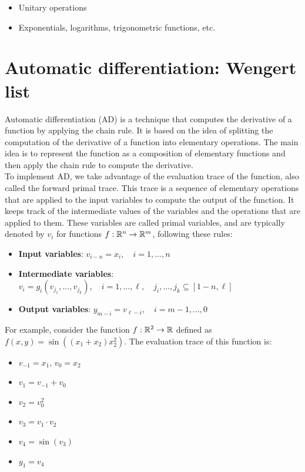 \begin{itemize}
    \item Unitary operations
    \item Exponentials, logarithms, trigonometric functions, etc.
\end{itemize}


\section{Automatic differentiation: Wengert list}

Automatic differentiation (AD) is a technique that computes the derivative of a function by applying the 
chain rule. It is based on the idea of splitting the computation of the derivative of a function into 
elementary operations. The main idea is to represent the function as a composition of elementary functions
and then apply the chain rule to compute the derivative.\\

To implement AD, we take advantage of the evaluation trace of the function, also called the forward primal
trace. This trace is a sequence of elementary operations that are applied to the input variables to compute
the output of the function. It keeps track of the intermediate values of the variables and the operations 
that are applied to them. These variables are called primal variables, and are typically denoted by $v_i$
for functions $f: \mathbb{R}^n \to \mathbb{R}^m$, following these rules:

\begin{itemize}
    \item \textbf{Input variables}: $v_{i-n} = x_i, \quad i = 1, ..., n$
    \item \textbf{Intermediate variables}: $v_i = g_i(v_{j_1}, ..., v_{j_k}), \quad i=1, ..., \ell, \quad j_i,...,j_k \subseteq [1-n, \ell]$
    \item \textbf{Output variables}: $y_{m-i} = v_{\ell - i}, \quad i = m-1, ..., 0$
\end{itemize}

For example, consider the function $f: \mathbb{R}^2 \to \mathbb{R}$ defined as $f(x, y) = \sin((x_1 + x_2) x_2^2)$. 
The evaluation trace of this function is:

\begin{itemize}
    \item $v_{-1} = x_1$, $v_{0} = x_2$
    \item $v_{1} = v_{-1} + v_{0}$
    \item $v_{2} = v_{0}^2$
    \item $v_{3} = v_{1} \cdot v_{2}$
    \item $v_{4} = \sin(v_{3})$
    \item $y_1 = v_4$
\end{itemize}

